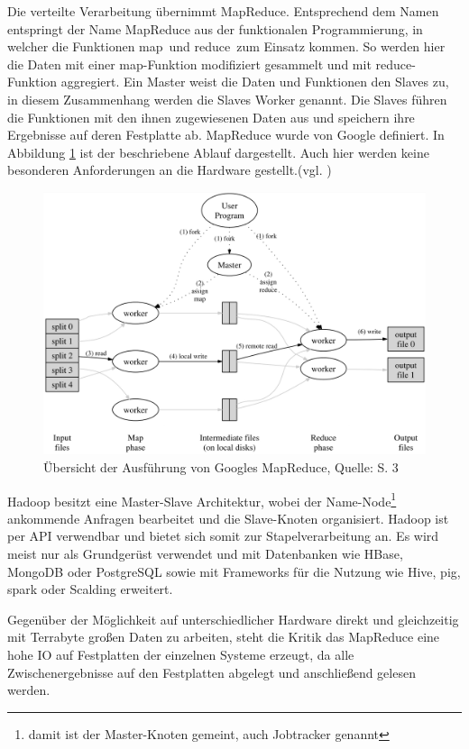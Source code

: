 Die verteilte Verarbeitung übernimmt MapReduce.
Entsprechend dem Namen entspringt der Name MapReduce aus der funktionalen Programmierung, in welcher die Funktionen \glqq map\grqq \ und \glqq reduce\grqq \ zum Einsatz kommen.
So werden hier die Daten mit einer map-Funktion modifiziert gesammelt und mit reduce-Funktion aggregiert.
Ein Master weist die Daten und Funktionen den Slaves zu, in diesem Zusammenhang werden die Slaves Worker genannt.
Die Slaves führen die Funktionen mit den ihnen zugewiesenen Daten aus und speichern ihre Ergebnisse auf deren Festplatte ab.
MapReduce wurde von Google definiert.
In Abbildung \ref{fig:mapreduce} ist der beschriebene Ablauf dargestellt.
Auch hier werden keine besonderen Anforderungen an die Hardware gestellt.(vgl. \cite[S.3]{paper:mapreduce})
%
\begin{figure}[h]
\centering
\includegraphics[width=\textwidth]{Abbildungen/mapreduce.png}
\caption[Übersicht der Ausführung von Googles MapReduce]{Übersicht der Ausführung von Googles MapReduce, Quelle: \cite{paper:mapreduce} S. 3}
\label{fig:mapreduce}
\end{figure}
Hadoop besitzt eine Master-Slave Architektur, wobei der Name-Node\footnote{damit ist der Master-Knoten gemeint, auch Jobtracker genannt} ankommende Anfragen bearbeitet und die Slave-Knoten organisiert.
Hadoop ist per API verwendbar und bietet sich somit zur Stapelverarbeitung an. %
Es wird meist nur als Grundgerüst verwendet und mit Datenbanken wie HBase, MongoDB oder PostgreSQL sowie mit Frameworks für die Nutzung wie Hive, \Gls{pig}, \Gls{spark} oder Scalding erweitert.

Gegenüber der Möglichkeit auf unterschiedlicher Hardware direkt und gleichzeitig mit Terrabyte großen Daten zu arbeiten, steht die Kritik das MapReduce eine hohe IO auf Festplatten der einzelnen Systeme erzeugt, da alle Zwischenergebnisse auf den Festplatten abgelegt und anschließend gelesen werden.

